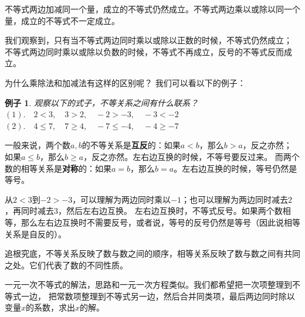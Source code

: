 \documentclass[12pt,UTF8]{ctexbook}
\newtheorem{ex}{例子}[section]
\begin{document}
不等式两边加减同一个量，成立的不等式仍然成立。不等式两边乘以或除以同一个量，成立的不等式不一定成立。

我们观察到，只有当不等式两边同时乘以或除以正数的时候，不等式仍然成立；
不等式两边同时乘以或除以负数的时候，不等式不再成立，反号的不等式反而成立。

为什么乘除法和加减法有这样的区别呢？
我们可以看以下的例子：
\begin{ex}\label{ex:4-1-20}
    观察以下的式子，不等关系之间有什么联系？\\
    $(1).\quad 2 < 3, \quad 3 > 2, \quad -2 > -3, \quad -3 < -2$ \\
    $(2). \quad 4 \leqslant 7, \quad 7 \geqslant 4, \quad -7 \leqslant -4, \quad -4 \geqslant -7$
\end{ex}
一般来说，两个数$a,b$的不等关系是\textbf{互反}的：如果$a < b$，那么$b > a$，反之亦然；
如果$a \leqslant b$，那么$b \geqslant a$，反之亦然。左右边互换的时候，不等号要反过来。
而两个数的相等关系是\textbf{对称}的：如果$a = b$，那么$b = a$。左右边互换的时候，等号仍然是等号。

从$2 < 3$到$-2 > -3$，可以理解为两边同时乘以$-1$；也可以理解为两边同时减去$2$，再同时减去$3$，然后左右边互换。
左右边互换时，不等式反号。如果两个数相等，那么左右边互换时不需要反号，或者说，等号的反号仍然是等号（因此说相等关系是自反的）。

追根究底，不等关系反映了数与数之间的顺序，相等关系反映了数与数之间有共同之处。它们代表了数的不同性质。

一元一次不等式的解法，思路和一元一次方程类似。我们都希望把一次项整理到不等式一边，
把常数项整理到不等式另一边，然后合并同类项，最后两边同时除以变量$x$的系数，求出$x$的解。
\end{document}
